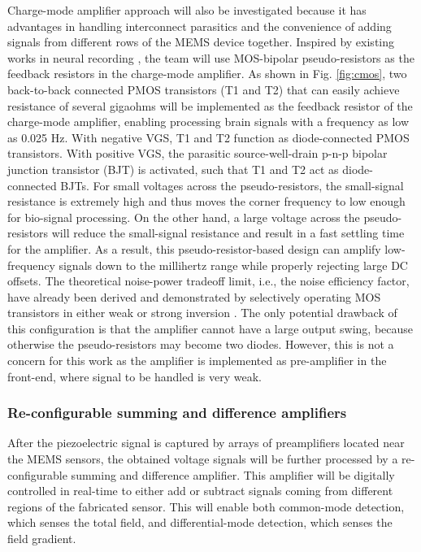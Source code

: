 Charge-mode amplifier approach will also be investigated because it has advantages in handling interconnect parasitics and the convenience of adding signals from different rows of the MEMS device together. Inspired by existing works in neural recording \cite{harrison2003low}, the team will use MOS-bipolar pseudo-resistors as the feedback resistors in the charge-mode amplifier. As shown in Fig. \ref{fig:cmos}, two back-to-back connected PMOS transistors (T1 and T2) that can easily achieve resistance of several gigaohms will be implemented as the feedback resistor of the charge-mode amplifier, enabling processing brain signals with a frequency as low as 0.025 Hz. With negative VGS, T1 and T2 function as diode-connected PMOS transistors. With positive VGS, the parasitic source-well-drain p-n-p bipolar junction transistor (BJT) is activated, such that T1 and T2 act as diode-connected BJTs. For small voltages across the pseudo-resistors, the small-signal resistance is extremely high and thus moves the corner frequency to low enough for bio-signal processing. On the other hand, a large voltage across the pseudo-resistors will reduce the small-signal resistance and result in a fast settling time for the amplifier. As a result, this pseudo-resistor-based design can amplify low-frequency signals down to the millihertz range while properly rejecting large DC offsets. The theoretical noise-power tradeoff limit, i.e., the noise efficiency factor, have already been derived and demonstrated by selectively operating MOS transistors in either weak or strong inversion \cite{harrison2003low}. The only potential drawback of this configuration is that the amplifier cannot have a large output swing, because otherwise the pseudo-resistors may become two diodes. However, this is not a concern for this work as the amplifier is implemented as pre-amplifier in the front-end, where signal to be handled is very weak.

\subsubsection{Re-configurable summing and difference amplifiers}

After the piezoelectric signal is captured by arrays of preamplifiers located near the MEMS sensors, the obtained voltage signals will be further processed by a re-configurable summing and difference amplifier. This amplifier will be digitally controlled in real-time to either add or subtract signals coming from different regions of the fabricated sensor. This will enable both common-mode detection, which senses the total field, and differential-mode detection, which senses the field gradient.

